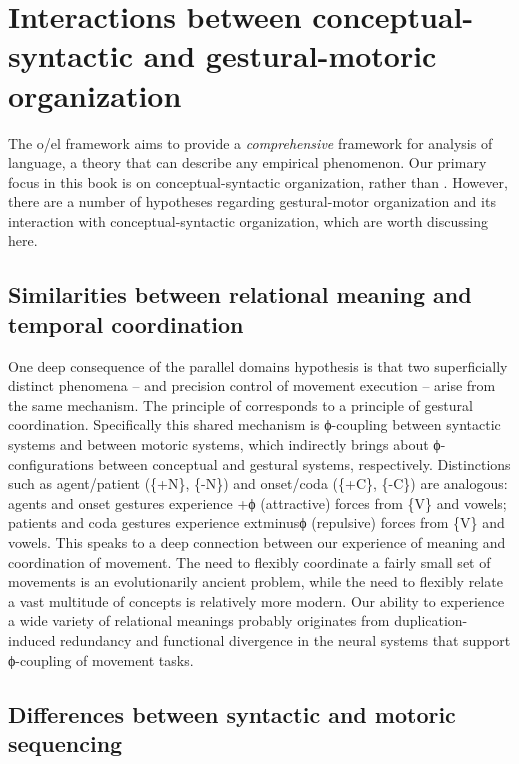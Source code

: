 \section{Interactions between conceptual-syntactic and gestural-motoric organization}

The o/el framework aims to provide a \textit{comprehensive} framework for analysis of language, a theory that can describe any empirical phenomenon. Our primary focus in this book is on conceptual-syntactic organization, rather than . However, there are a number of hypotheses regarding gestural-motor organization and its interaction with conceptual-syntactic organization, which are worth discussing here.

\subsection{Similarities between relational meaning and temporal coordination}

One deep consequence of the parallel domains hypothesis is that two superficially distinct phenomena --  and precision control of movement execution -- arise from the same mechanism. The principle of  corresponds to a principle of gestural coordination. Specifically this shared mechanism is ϕ-coupling between syntactic systems and between motoric systems, which indirectly brings about ϕ-configurations between conceptual and gestural systems, respectively. Distinctions such as agent/patient (\{+N\}, \{-N\}) and onset/coda (\{+C\}, \{-C\}) are analogous: agents and onset gestures experience +ϕ (attractive) forces from \{V\} and vowels; patients and coda gestures experience 	extminus{}ϕ (repulsive) forces from \{V\} and vowels. This speaks to a deep connection between our experience of meaning and coordination of movement. The need to flexibly coordinate a fairly small set of movements is an evolutionarily ancient problem, while the need to flexibly relate a vast multitude of concepts is relatively more modern. Our ability to experience a wide variety of relational meanings probably originates from duplication-induced redundancy and functional divergence in the neural systems that support ϕ-coupling of movement tasks. 

\subsection{Differences between syntactic and motoric sequencing} 

